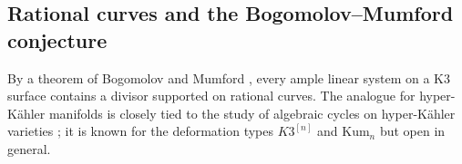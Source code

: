 \documentclass[11pt]{article}
\newcommand{\Z}{\mathbb{Z}}
\newcommand{\bbP}{\mathbb{P}}
\newcommand{\cA}{\mathcal{A}}
\newcommand{\cO}{\mathcal{O}}
\newcommand{\Kum}{\mathrm{Kum}}
\theoremstyle{compact}
\begin{document}
%


\subsection{Rational curves and the Bogomolov--Mumford conjecture}\label{HKBM}

By a theorem of Bogomolov and Mumford \cite{mori-mukai83}, every ample linear system on a K3
surface contains a divisor supported on rational curves. The analogue for hyper-K\"ahler
manifolds is closely tied to the study of algebraic cycles on hyper-K\"ahler varieties
\cite{cmp19}; it is known for the deformation types $K3^{[n]}$ and $\Kum_n$ but open in
general.
\end{document}
